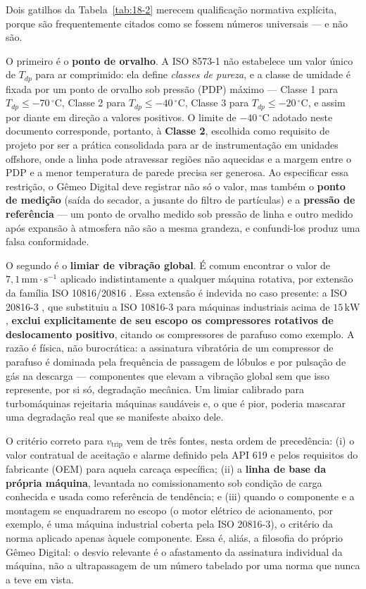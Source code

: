 \documentclass[12pt,a4paper]{article}
\numberwithin{equation}{section}
\numberwithin{table}{section}
\numberwithin{figure}{section}
\begin{document}
Dois gatilhos da Tabela~\ref{tab:18-2} merecem qualificação normativa explícita, porque são frequentemente citados como se fossem números universais — e não são.

O primeiro é o \textbf{ponto de orvalho}. A ISO 8573-1 \cite{iso8573} não estabelece um valor único de $T_{dp}$ para ar comprimido: ela define \textit{classes de pureza}, e a classe de umidade é fixada por um ponto de orvalho sob pressão (PDP) máximo — Classe 1 para $T_{dp} \le -70\,^{\circ}$C, Classe 2 para $T_{dp} \le -40\,^{\circ}$C, Classe 3 para $T_{dp} \le -20\,^{\circ}$C, e assim por diante em direção a valores positivos. O limite de $-40\,^{\circ}$C adotado neste documento corresponde, portanto, à \textbf{Classe 2}, escolhida como requisito de projeto por ser a prática consolidada para ar de instrumentação em unidades offshore, onde a linha pode atravessar regiões não aquecidas e a margem entre o PDP e a menor temperatura de parede precisa ser generosa. Ao especificar essa restrição, o Gêmeo Digital deve registrar não só o valor, mas também o \textbf{ponto de medição} (saída do secador, a jusante do filtro de partículas) e a \textbf{pressão de referência} — um ponto de orvalho medido sob pressão de linha e outro medido após expansão à atmosfera não são a mesma grandeza, e confundi-los produz uma falsa conformidade.

O segundo é o \textbf{limiar de vibração global}. É comum encontrar o valor de $7{,}1\,\text{mm}\cdot\text{s}^{-1}$ aplicado indistintamente a qualquer máquina rotativa, por extensão da família ISO 10816/20816 \cite{iso10816, iso20816}. Essa extensão é indevida no caso presente: a ISO 20816-3 \cite{iso20816}, que substituiu a ISO 10816-3 para máquinas industriais acima de $15\,\text{kW}$, \textbf{exclui explicitamente de seu escopo os compressores rotativos de deslocamento positivo}, citando os compressores de parafuso como exemplo. A razão é física, não burocrática: a assinatura vibratória de um compressor de parafuso é dominada pela frequência de passagem de lóbulos e por pulsação de gás na descarga — componentes que elevam a vibração global sem que isso represente, por si só, degradação mecânica. Um limiar calibrado para turbomáquinas rejeitaria máquinas saudáveis e, o que é pior, poderia mascarar uma degradação real que se manifeste abaixo dele.

O critério correto para $v_{\text{trip}}$ vem de três fontes, nesta ordem de precedência: (i) o valor contratual de aceitação e alarme definido pela API 619 \cite{api619} e pelos requisitos do fabricante (OEM) para aquela carcaça específica; (ii) a \textbf{linha de base da própria máquina}, levantada no comissionamento sob condição de carga conhecida e usada como referência de tendência; e (iii) quando o componente e a montagem se enquadrarem no escopo (o motor elétrico de acionamento, por exemplo, é uma máquina industrial coberta pela ISO 20816-3), o critério da norma aplicado apenas àquele componente. Essa é, aliás, a filosofia do próprio Gêmeo Digital: o desvio relevante é o afastamento da assinatura individual da máquina, não a ultrapassagem de um número tabelado por uma norma que nunca a teve em vista.
\end{document}
